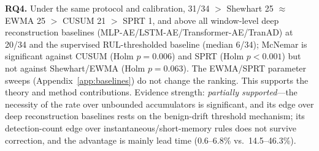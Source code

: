 \documentclass[journal]{IEEEtran}
\begin{document}
\textbf{RQ4.} Under the same protocol and calibration, 31/34 $>$ Shewhart 25 $\approx$ EWMA 25 $>$ CUSUM 21 $>$ SPRT 1, and above all window-level deep reconstruction baselines (MLP-AE/LSTM-AE/Transformer-AE/TranAD) at 20/34 and the supervised RUL-thresholded baseline (median 6/34); McNemar is significant against CUSUM (Holm $p=0.006$) and SPRT (Holm $p<0.001$) but not against Shewhart/EWMA (Holm $p=0.063$). The EWMA/SPRT parameter sweeps (Appendix~\ref{app:baselines}) do not change the ranking. This supports the theory and method contributions. Evidence strength: \emph{partially supported}---the necessity of the rate over unbounded accumulators is significant, and its edge over deep reconstruction baselines rests on the benign-drift threshold mechanism; its detection-count edge over instantaneous/short-memory rules does not survive correction, and the advantage is mainly lead time (0.6--6.8\% vs.\ 14.5--46.3\%).
\end{document}
